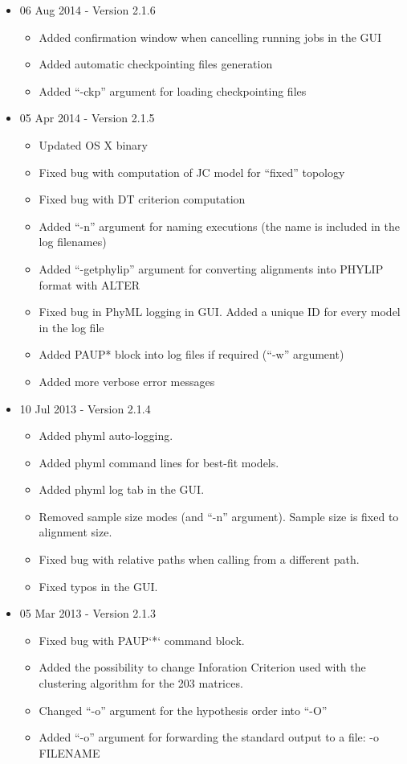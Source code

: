\begin{itemize}
	\item 06 Aug 2014 - Version 2.1.6
	\begin{itemize}
		\item Added confirmation window when cancelling running jobs in the GUI
		\item Added automatic checkpointing files generation
		\item Added ``-ckp'' argument for loading checkpointing files
	\end{itemize}

	\item 05 Apr 2014 - Version 2.1.5
	\begin{itemize}
		\item Updated OS X binary
		\item Fixed bug with computation of JC model for ``fixed'' topology
		\item Fixed bug with DT criterion computation
		\item Added ``-n'' argument for naming executions (the name is included in the log filenames)
		\item Added ``-getphylip'' argument for converting alignments into PHYLIP format with ALTER
		\item Fixed bug in PhyML logging in GUI. Added a unique ID for every model in the log file
		\item Added PAUP* block into log files if required (``-w'' argument)
		\item Added more verbose error messages 
	\end{itemize}

	\item 10 Jul 2013 - Version 2.1.4
	\begin{itemize}
		\item Added phyml auto-logging.
		\item Added phyml command lines for best-fit models.
		\item Added phyml log tab in the GUI.
		\item Removed sample size modes (and ``-n'' argument). Sample size is fixed to alignment size.
		\item Fixed bug with relative paths when calling from a different path.
		\item Fixed typos in the GUI. 
	\end{itemize}

	\item 05 Mar 2013 - Version 2.1.3
	\begin{itemize}
		\item Fixed bug with PAUP`*` command block.
		\item Added the possibility to change Inforation Criterion used with the clustering algorithm for the 203 matrices.
		\item Changed ``-o'' argument for the hypothesis order into ``-O''
		\item Added ``-o'' argument for forwarding the standard output to a file: -o FILENAME 
	\end{itemize}


\end{itemize}

